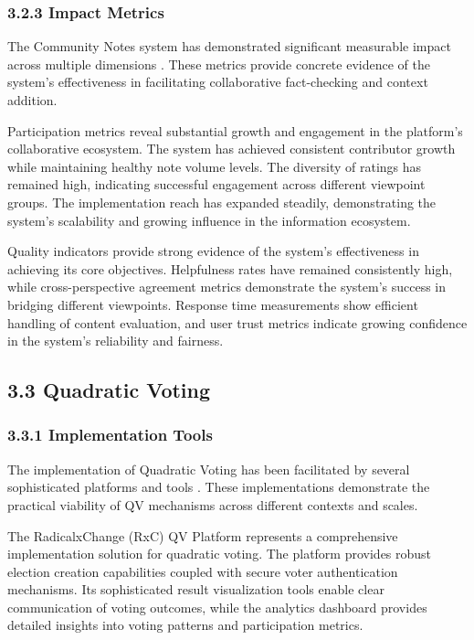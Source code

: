 \hypertarget{impact-metrics}{%
\subsubsection{3.2.3 Impact Metrics}\label{impact-metrics}}

The Community Notes system has demonstrated significant measurable impact across multiple dimensions \citep{communitynotes2024}. These metrics provide concrete evidence of the system's effectiveness in facilitating collaborative fact-checking and context addition.

Participation metrics reveal substantial growth and engagement in the platform's collaborative ecosystem. The system has achieved consistent contributor growth while maintaining healthy note volume levels. The diversity of ratings has remained high, indicating successful engagement across different viewpoint groups. The implementation reach has expanded steadily, demonstrating the system's scalability and growing influence in the information ecosystem.

Quality indicators provide strong evidence of the system's effectiveness in achieving its core objectives. Helpfulness rates have remained consistently high, while cross-perspective agreement metrics demonstrate the system's success in bridging different viewpoints. Response time measurements show efficient handling of content evaluation, and user trust metrics indicate growing confidence in the system's reliability and fairness.

\hypertarget{quadratic-voting}{%
\subsection{3.3 Quadratic Voting}\label{quadratic-voting}}

\hypertarget{implementation-tools}{%
\subsubsection{3.3.1 Implementation Tools}\label{implementation-tools}}

The implementation of Quadratic Voting has been facilitated by several sophisticated platforms and tools \citep{coloradoqv2019}. These implementations demonstrate the practical viability of QV mechanisms across different contexts and scales.

The RadicalxChange (RxC) QV Platform represents a comprehensive implementation solution for quadratic voting. The platform provides robust election creation capabilities coupled with secure voter authentication mechanisms. Its sophisticated result visualization tools enable clear communication of voting outcomes, while the analytics dashboard provides detailed insights into voting patterns and participation metrics.

